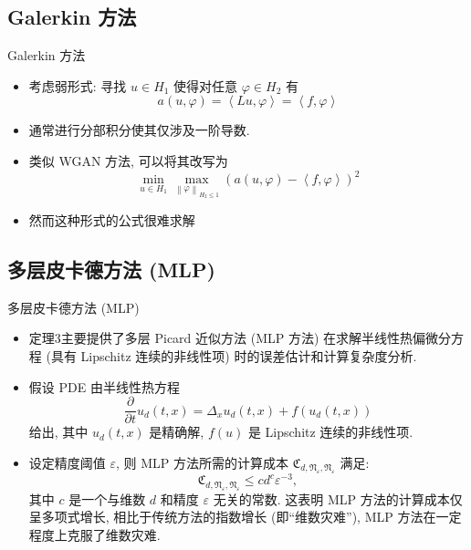 \documentclass[aspectratio=169]{beamer}
\begin{document}
	\subsection{Galerkin 方法}
	\begin{frame}{Galerkin 方法}
		\begin{itemize}
			\item 考虑弱形式: 寻找 $u \in H_{1}$ 使得对任意 $\varphi \in H_{2}$ 有
				\begin{equation*}
					a\left(u, \varphi\right) = \left\langle Lu, \varphi\right\rangle = \left\langle f, \varphi\right\rangle
				\end{equation*}
			\item 通常进行分部积分使其仅涉及一阶导数.
			\item 类似 WGAN 方法, 可以将其改写为
				\begin{equation*}
					\min_{u \in H_{1}} \max_{\left\lVert\varphi\right\rVert _{H_{2} \leq 1}} \left(a\left(u, \varphi\right) - \left\langle f, \varphi\right\rangle\right)^{2}
				\end{equation*}
			\item 然而这种形式的公式很难求解
		\end{itemize}
	\end{frame}

	\subsection{多层皮卡德方法 (MLP)}
	\begin{frame}{多层皮卡德方法 (MLP)}
		\begin{itemize}
			\item 定理3主要提供了多层 Picard 近似方法 (MLP 方法) 在求解半线性热偏微分方程 (具有 Lipschitz 连续的非线性项) 时的误差估计和计算复杂度分析. 
			\item 假设 PDE 由半线性热方程
				\begin{equation*}
					\frac{\partial}{\partial t} u_{d}\left(t, x\right) = \Delta_{x} u_{d}\left(t, x\right) + f\left(u_{d}\left(t,x\right)\right)
				\end{equation*}
				给出, 其中 $u_{d}\left(t, x\right)$ 是精确解, $f\left(u\right)$ 是 Lipschitz 连续的非线性项.
			\item 设定精度阈值  $\varepsilon$, 则 MLP 方法所需的计算成本 $\mathfrak{C}_{d,\mathfrak{N}_{\varepsilon}, \mathfrak{N}_{\varepsilon}}$ 满足:
				\begin{equation*}
					\mathfrak{C}_{d,\mathfrak{N}_{\varepsilon}, \mathfrak{N}_{\varepsilon}} \leq cd^{c}\varepsilon^{-3},
				\end{equation*}
     			其中 $c$ 是一个与维数 $d$ 和精度 $\varepsilon$ 无关的常数. 这表明 MLP 方法的计算成本仅呈多项式增长, 相比于传统方法的指数增长 (即``维数灾难''), MLP 方法在一定程度上克服了维数灾难.
			\end{itemize}
		\end{frame}
\end{document}
